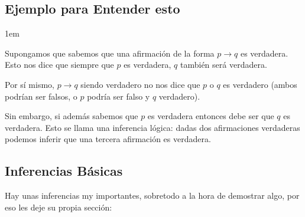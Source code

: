 \documentclass[12pt, fleqn]{report}                             %
\newenvironment{SmallIndentation}[1][0.75em]                    %
        {\begin{adjustwidth}{#1}{}\begin{footnotesize}}             %
        {\end{footnotesize}\end{adjustwidth}}                       %
\theoremstyle{break}                                            %
\begin{document}
            \subsection{Ejemplo para Entender esto}

                \begin{SmallIndentation}[1em]

                    Supongamos que sabemos que una afirmación de la forma $p \to q$ es verdadera.
                    Esto nos dice que siempre que $p$ es verdadera, $q$ también será verdadera. 

                    Por sí mismo, $p \to q$ siendo verdadero no nos dice que $p$ o $q$ es verdadero
                    (ambos podrían ser falsos, o $p$ podría ser falso y $q$ verdadero).

                    Sin embargo, si además sabemos que $p$ es verdadera entonces debe ser que $q$ es verdadera.
                    Esto se llama una inferencia lógica: dadas dos afirmaciones verdaderas podemos inferir
                    que una tercera afirmación es verdadera.
                
                \end{SmallIndentation}


            \clearpage
            \subsection{Inferencias Básicas}

                Hay unas inferencias my importantes, sobretodo a la hora de demostrar algo, por eso les
                deje su propia sección:
\end{document}
